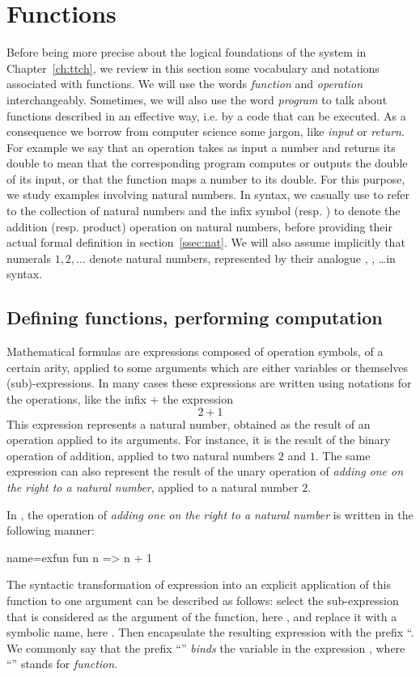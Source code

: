 \section{Functions}\label{sec:functions}
 Before being more
precise about the logical foundations of the \Coq{} system in
Chapter~\ref{ch:ttch},
we review in this section some vocabulary and notations associated
with functions.
We will use the words \emph{function} and \emph{operation}
interchangeably. Sometimes, we will also use the word \emph{program}
to talk about functions described in an effective way, i.e. by a code
that can be executed. As a consequence we borrow from computer science
some jargon, like \emph{input} or \emph{return}. For example we say that
an operation takes as input a number and returns its double to mean
that the corresponding program computes or outputs the double of its
input, or that the function maps a number to its double. For
this purpose, we study examples involving natural numbers. In \Coq{}
syntax, we casually use  to refer to the collection of natural
numbers and the infix symbol  \C{+} (resp. \C{*}) to denote the  addition
(resp. product) operation on natural numbers,  before providing their
actual formal definition in section~\ref{ssec:nat}. We will also
assume implicitly that numerals $1, 2, \dots$ denote natural numbers,
represented by their analogue , , \dots in \Coq{} syntax.


\subsection{Defining functions, performing computation}\label{ssec:deffun}
Mathematical formulas are expressions composed of operation symbols,
of a certain arity, applied to some arguments which are
either variables or themselves (sub)-expressions.
In many cases these
expressions are written using notations for the operations, like the
infix $+$ the expression
\[ 2 + 1 \]
This expression represents a natural number, obtained as the result of
an operation applied to its arguments. For instance, it is the result
of the binary operation of addition, applied to two natural numbers
$2$ and $1$. The same expression can also represent the result of the
unary operation of {\em adding one on the right to a natural number},
applied to a natural number $2$.

In \Coq{}, the operation of {\em adding one on the right to a natural number} is
written in the following manner:

\begin{coq}{name=exfun}{}
  fun n => n + 1
\end{coq}
The syntactic transformation of expression  into an
explicit application of this function to one argument can be
described as follows: select the sub-expression that is considered as
the argument of the function, here , and replace it with a
symbolic name, here . Then encapsulate the resulting expression
 with the prefix ``. We commonly
say that the prefix ``'' \emph{binds} the variable  in the
expression , where ``'' stands for
\emph{function}.

